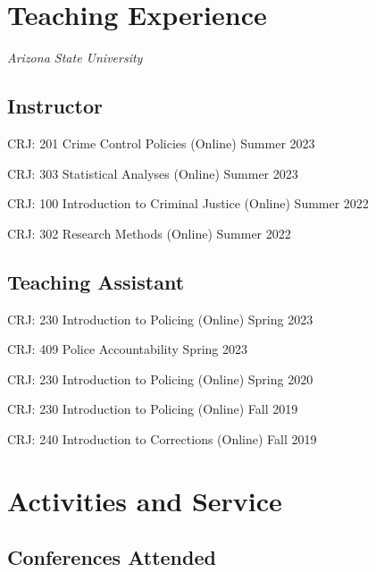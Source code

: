 \documentclass[11pt,]{article}
\begin{document}
\vspace{2mm}

\hypertarget{teaching-experience}{%
\section{Teaching Experience}\label{teaching-experience}}

\emph{Arizona State University}

\hypertarget{instructor}{%
\subsection{Instructor}\label{instructor}}

CRJ: 201 Crime Control Policies (Online) \hfill Summer 2023

CRJ: 303 Statistical Analyses (Online) \hfill Summer 2023

CRJ: 100 Introduction to Criminal Justice (Online) \hfill Summer 2022

CRJ: 302 Research Methods (Online) \hfill Summer 2022

\vspace{2mm}

\hypertarget{teaching-assistant}{%
\subsection{Teaching Assistant}\label{teaching-assistant}}

CRJ: 230 Introduction to Policing (Online) \hfill Spring 2023

CRJ: 409 Police Accountability \hfill Spring 2023

CRJ: 230 Introduction to Policing (Online) \hfill Spring 2020

CRJ: 230 Introduction to Policing (Online) \hfill Fall 2019

CRJ: 240 Introduction to Corrections (Online) \hfill Fall 2019

\vspace{2mm}

\hypertarget{activities-and-service}{%
\section{Activities and Service}\label{activities-and-service}}

\hypertarget{conferences-attended}{%
\subsection{Conferences Attended}\label{conferences-attended}}
\end{document}
